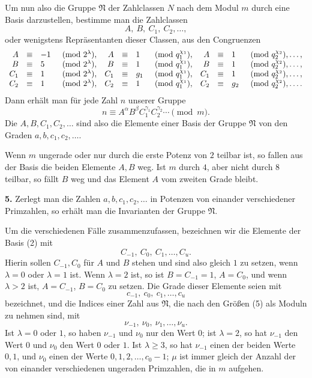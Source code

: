 \documentclass[11pt]{article}
\providecommand{\grpN}{\mathfrak N}
\begin{document}
Um nun also die Gruppe $\grpN$ der Zahlclassen $N$ nach dem Modul $m$ durch eine Basis darzustellen, bestimme man die Zahlclassen
\begin{equation}
 A,\ B,\ C_1,\ C_2,\ldots,
\tag{2}
\end{equation}
oder wenigstens Repräsentanten dieser Classen, aus den Congruenzen
\[
\begin{array}{rcll@{\quad}rcll@{\quad}rcll}
A&\equiv&-1&\pmod {2^\lambda},& A&\equiv&1&\pmod {q_1^{\chi_1}},&A&\equiv&1&\pmod {q_2^{\chi_2}},\ldots,\\
B&\equiv&5&\pmod {2^\lambda},& B&\equiv&1&\pmod {q_1^{\chi_1}},&B&\equiv&1&\pmod {q_2^{\chi_2}},\ldots,\\
C_1&\equiv&1&\pmod {2^\lambda},&C_1&\equiv&g_1&\pmod {q_1^{\chi_1}},&C_1&\equiv&1&\pmod {q_2^{\chi_2}},\ldots,\\
C_2&\equiv&1&\pmod {2^\lambda},&C_2&\equiv&1&\pmod {q_1^{\chi_1}},&C_2&\equiv&g_2&\pmod {q_2^{\chi_2}},\ldots.
\end{array}
\]
Dann erhält man für jede Zahl $n$ unserer Gruppe
\begin{equation}
 n\equiv A^\alpha B^\beta C_1^{\gamma_1}C_2^{\gamma_2}\cdots\pmod m .
\tag{3}
\end{equation}
Die $A,B,C_1,C_2,
\ldots$ sind also die Elemente einer Basis der Gruppe $\grpN$ von den Graden $a,b,c_1,c_2,
\ldots$.

Wenn $m$ ungerade oder nur durch die erste Potenz von $2$ teilbar ist, so fallen aus der Basis die beiden Elemente $A,B$ weg. Ist $m$ durch $4$, aber nicht durch $8$ teilbar, so fällt $B$ weg und das Element $A$ vom zweiten Grade bleibt.

\medskip
\noindent\textbf{5.} Zerlegt man die Zahlen $a,b,c_1,c_2,
\ldots$ in Potenzen von einander verschiedener Primzahlen, so erhält man die Invarianten der Gruppe $\grpN$.

Um die verschiedenen Fälle zusammenzufassen, bezeichnen wir die Elemente der Basis (2) mit
\begin{equation}
 C_{-1},\ C_0,\ C_1,\ldots,C_u.
\tag{4}
\end{equation}
Hierin sollen $C_{-1},C_0$ für $A$ und $B$ stehen und sind also gleich $1$ zu setzen, wenn $\lambda=0$ oder $\lambda=1$ ist. Wenn $\lambda=2$ ist, so ist $B=C_{-1}=1$, $A=C_0$, und wenn $\lambda>2$ ist, $A=C_{-1}$, $B=C_0$ zu setzen. Die Grade dieser Elemente seien mit
\begin{equation}
 c_{-1},\ c_0,\ c_1,
\ldots,c_u
\tag{5}
\end{equation}
bezeichnet, und die Indices einer Zahl aus $\grpN$, die nach den Größen (5) als Moduln zu nehmen sind, mit
\begin{equation}
 \nu_{-1},\ \nu_0,\ \nu_1,
\ldots,\nu_u.
\tag{6}
\end{equation}
Ist $\lambda=0$ oder $1$, so haben $\nu_{-1}$ und $\nu_0$ nur den Wert $0$; ist $\lambda=2$, so hat $\nu_{-1}$ den Wert $0$ und $\nu_0$ den Wert $0$ oder $1$. Ist $\lambda\geq 3$, so hat $\nu_{-1}$ einen der beiden Werte $0,1$, und $\nu_0$ einen der Werte $0,1,
2,
\ldots,c_0-1$; $\mu$ ist immer gleich der Anzahl der von einander verschiedenen ungeraden Primzahlen, die in $m$ aufgehen.
\end{document}
